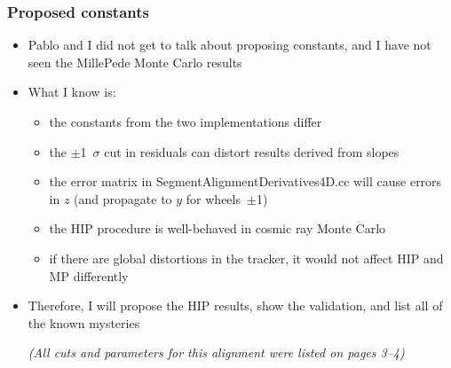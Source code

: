 \documentclass[compress]{beamer}
\begin{document}
\begin{frame}
\frametitle{Proposed constants}
\begin{itemize}
\item Pablo and I did not get to talk about proposing constants, and I
  have not seen the MillePede Monte Carlo results
\item What I know is:
\begin{itemize}\setlength{\itemsep}{0.1 cm}
\item the constants from the two implementations differ
\item the $\pm$1~$\sigma$ cut in residuals can distort results derived from slopes
\item the error matrix in SegmentAlignmentDerivatives4D.cc will cause
  errors in $z$ (and propagate to $y$ for wheels~$\pm$1)
\item the HIP procedure is well-behaved in cosmic ray Monte Carlo
\item if there are global distortions in the tracker, it would not affect HIP and MP differently
\end{itemize}
\item Therefore, I will propose the HIP results, show the validation, and list all of the known mysteries

{\scriptsize \it (All cuts and parameters for this alignment were listed on pages 3--4)}
\end{itemize}
\end{frame}
\end{document}
